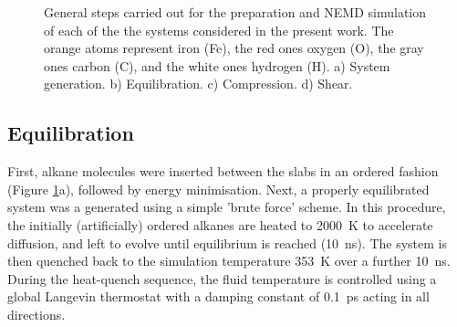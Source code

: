 \documentclass[aps,prb,reprint,superscriptaddress, a4paper]{revtex4-1}
\begin{document}
\begin{figure}
\begin{center}

		\caption{General steps carried out for the preparation and NEMD simulation of   each of the the systems considered in the present work. The orange atoms represent iron (Fe), the red ones oxygen (O), the gray ones carbon (C), and the white ones hydrogen (H). a) System generation. b) Equilibration. c) Compression. d) Shear. }
		\label{fig:Steps}
	\end{center}
\end{figure}

\subsection{Equilibration}

First, alkane molecules were inserted between the slabs in an ordered fashion (Figure \ref{fig:Steps}a), followed by energy minimisation. Next, a properly equilibrated system was a generated using a simple 'brute force' scheme. In this procedure, the initially (artificially) ordered alkanes are heated to \SI{2000}{\kelvin} to accelerate diffusion, and left to evolve until equilibrium is reached (\SI{10}{\nano\second}). The system is then quenched back to the simulation temperature \SI{353}{\kelvin} over a further \SI{10}{\nano\second}. During the heat-quench sequence, the fluid temperature is controlled using a global Langevin thermostat \cite{Schneider1978} with a damping constant of \SI{0.1}{\pico\second} acting in all directions.
\end{document}
